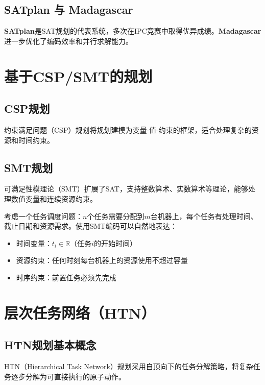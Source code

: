 \subsection{SATplan 与 Madagascar}

\textbf{SATplan}是SAT规划的代表系统，多次在IPC竞赛中取得优异成绩。\textbf{Madagascar}进一步优化了编码效率和并行求解能力。

\section{基于CSP/SMT的规划 \ug}

\subsection{CSP规划}

约束满足问题（CSP）规划将规划建模为变量-值-约束的框架，适合处理复杂的资源和时间约束。

\subsection{SMT规划 \grad}

可满足性模理论（SMT）扩展了SAT，支持整数算术、实数算术等理论，能够处理数值变量和连续资源约束。

\begin{example}
考虑一个任务调度问题：$n$个任务需要分配到$m$台机器上，每个任务有处理时间、截止日期和资源需求。使用SMT编码可以自然地表达：
\begin{itemize}
  \item 时间变量：$t_i \in \mathbb{R}$（任务$i$的开始时间）
  \item 资源约束：任何时刻每台机器上的资源使用不超过容量
  \item 时序约束：前置任务必须先完成
\end{itemize}
\end{example}

\section{层次任务网络（HTN） \ug}

\subsection{HTN规划基本概念}

HTN（Hierarchical Task Network）规划采用自顶向下的任务分解策略，将复杂任务逐步分解为可直接执行的原子动作。

